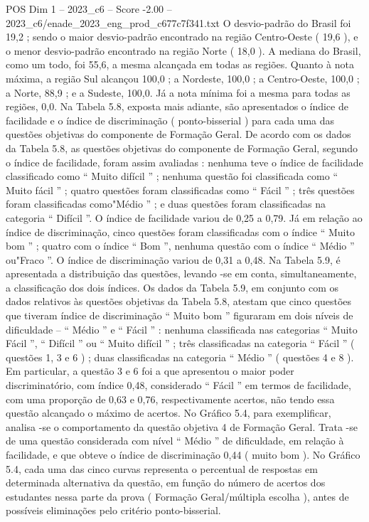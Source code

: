 \begin{textsample}{POS Dim 1 – 2023\_c6 – Score -2.00 – 2023\_c6/enade\_2023\_eng\_prod\_c677c7f341.txt}
O desvio-padrão do Brasil foi 19,2 ; sendo o maior desvio-padrão encontrado na região Centro-Oeste ( 19,6 ), e o menor desvio-padrão encontrado na região Norte ( 18,0 ).
A mediana do Brasil, como um todo, foi 55,6, a mesma alcançada em todas as regiões.
Quanto à nota máxima, a região Sul alcançou 100,0 ; a Nordeste, 100,0 ; a Centro-Oeste, 100,0 ; a Norte, 88,9 ; e a Sudeste, 100,0.
Já a nota mínima foi a mesma para todas as regiões, 0,0.
Na Tabela 5.8, exposta mais adiante, são apresentados o índice de facilidade e o índice de discriminação ( ponto-bisserial ) para cada uma das questões objetivas do componente de Formação Geral.
De acordo com os dados da Tabela 5.8, as questões objetivas do componente de Formação Geral, segundo o índice de facilidade, foram assim avaliadas : nenhuma teve o índice de facilidade classificado como “ Muito difícil ” ; nenhuma questão foi classificada como “ Muito fácil ” ; quatro questões foram classificadas como “ Fácil ” ; três questões foram classificadas como"Médio ” ; e duas questões foram classificadas na categoria “ Difícil ”.
O índice de facilidade variou de 0,25 a 0,79.
Já em relação ao índice de discriminação, cinco questões foram classificadas com o índice “ Muito bom ” ; quatro com o índice “ Bom ”, nenhuma questão com o índice “ Médio ” ou"Fraco ”.
O índice de discriminação variou de 0,31 a 0,48.
Na Tabela 5.9, é apresentada a distribuição das questões, levando -se em conta, simultaneamente, a classificação dos dois índices.
Os dados da Tabela 5.9, em conjunto com os dados relativos às questões objetivas da Tabela 5.8, atestam que cinco questões que tiveram índice de discriminação “ Muito bom ” figuraram em dois níveis de dificuldade – “ Médio ” e “ Fácil ” : nenhuma classificada nas categorias “ Muito Fácil ”, “ Difícil ” ou “ Muito difícil ” ; três classificadas na categoria “ Fácil ” ( questões 1, 3 e 6 ) ; duas classificadas na categoria “ Médio ” ( questões 4 e 8 ).
Em particular, a questão 3 e 6 foi a que apresentou o maior poder discriminatório, com índice 0,48, considerado “ Fácil ” em termos de facilidade, com uma proporção de 0,63 e 0,76, respectivamente acertos, não tendo essa questão alcançado o máximo de acertos.
No Gráfico 5.4, para exemplificar, analisa -se o comportamento da questão objetiva 4 de Formação Geral.
Trata -se de uma questão considerada com nível “ Médio ” de dificuldade, em relação à facilidade, e que obteve o índice de discriminação 0,44 ( muito bom ).
No Gráfico 5.4, cada uma das cinco curvas representa o percentual de respostas em determinada alternativa da questão, em função do número de acertos dos estudantes nessa parte da prova ( Formação Geral/múltipla escolha ), antes de possíveis eliminações pelo critério ponto-bisserial.

\end{textsample}
